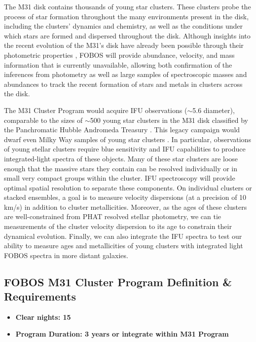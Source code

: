\documentclass[11pt,a4paper,twoside,onecolumn,openany,final,oldfontcommands]{memoir}
\begin{document}
The M31 disk contains thousands of young star clusters.  These clusters probe the process of star formation throughout the many environments present in the disk, including the clusters' dynamics and chemistry, as well as the conditions under which stars are formed and dispersed throughout the disk.  Although insights into the recent evolution of the M31's disk have already been possible through their photometric properties \citep[e.g.,][]{johnson16}, FOBOS will provide abundance, velocity, and mass information that is currently unavailable, allowing both confirmation of the inferences from photometry as well as large samples of spectroscopic masses and abundances to track the recent formation of stars and metals in clusters across the disk. 

The M31 Cluster Program would acquire IFU observations ($\sim$5.6\arcsec{} diameter), comparable to the sizes of $\sim$500 young star clusters in the M31 disk classified by the Panchromatic Hubble Andromeda Treasury \citep[PHAT;][]{johnson15}.  This legacy campaign would dwarf even Milky Way samples of young star clusters \citep{johnson15}.  In particular, observations of young stellar clusters require blue sensitivity and IFU capabilities to produce integrated-light spectra of these objects. Many of these star clusters are loose enough that the massive stars they contain can be resolved individually or in small very compact groups within the cluster.  IFU spectroscopy will provide optimal spatial resolution to separate these components.  On individual clusters or stacked ensembles, a goal  is to measure velocity dispersions (at a precision of 10 km/s) in addition to cluster metallicities.  Moreover, as the ages of these clusters are well-constrained from PHAT resolved stellar photometry, we can tie measurements of the cluster velocity dispersion to its age to constrain their dynamical evolution.  Finally, we can also integrate the IFU spectra to test our ability to measure ages and metallicities of young clusters with integrated light FOBOS spectra in more distant galaxies.



\subsection{FOBOS M31 Cluster Program Definition \& Requirements}

\medskip
\begin{itemize}[leftmargin=0.3in, itemsep=0pt]
	\item[] \textbf{Clear nights: 15}
	\item[] \textbf{Program Duration: 3 years or integrate within M31 Program}
\end{itemize}
\end{document}
